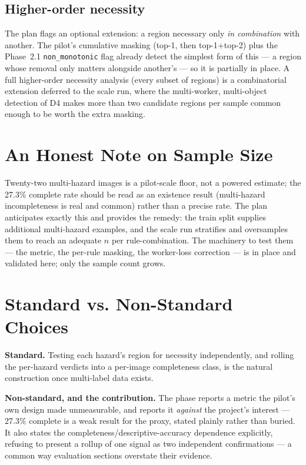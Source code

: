 \subsection{Higher-order necessity}

The plan flags an optional extension: a region necessary only \emph{in combination} with another. The
pilot's cumulative masking (top-1, then top-1+top-2) plus the Phase~2.1 \texttt{non\_monotonic} flag
already detect the simplest form of this --- a region whose removal only matters alongside another's ---
so it is partially in place. A full higher-order necessity analysis (every subset of regions) is a
combinatorial extension deferred to the scale run, where the multi-worker, multi-object detection of D4
makes more than two candidate regions per sample common enough to be worth the extra masking.

\section{An Honest Note on Sample Size}

Twenty-two multi-hazard images is a pilot-scale floor, not a powered estimate; the 27.3\% complete rate
should be read as an existence result (multi-hazard incompleteness is real and common) rather than a
precise rate. The plan anticipates exactly this and provides the remedy: the train split supplies
additional multi-hazard examples, and the scale run stratifies and oversamples them to reach an adequate
$n$ per rule-combination. The machinery to test them --- the metric, the per-rule masking, the
worker-loss correction --- is in place and validated here; only the sample count grows.

\section{Standard vs. Non-Standard Choices}

\textbf{Standard.} Testing each hazard's region for necessity independently, and rolling the per-hazard
verdicts into a per-image completeness class, is the natural construction once multi-label data exists.

\textbf{Non-standard, and the contribution.} The phase reports a metric the pilot's own design made
unmeasurable, and reports it \emph{against} the project's interest --- 27.3\% complete is a weak result
for the proxy, stated plainly rather than buried. It also states the completeness/descriptive-accuracy
dependence explicitly, refusing to present a rollup of one signal as two independent confirmations ---
a common way evaluation sections overstate their evidence.

